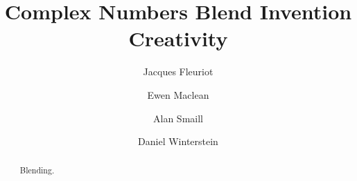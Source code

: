 \documentclass{ecai2014}
\begin{document}
\title{Complex Numbers Blend Invention Creativity}

\author{Jacques Fleuriot \and Ewen Maclean \and Alan Smaill \and Daniel Winterstein  }

\maketitle


\begin{abstract}
 Blending.
\end{abstract}


















\end{document}
